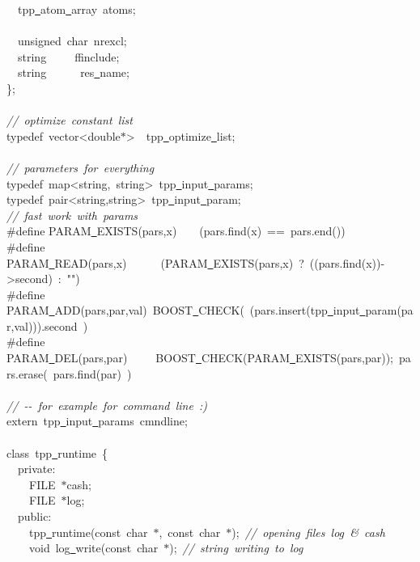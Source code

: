 \documentclass[a4paper,10pt]{article}
\begin{document}
{\ \ tpp\underline\ atom\underline\ array\ atoms;\\
\ \\
\ \ unsigned\ char\ nrexcl;\\
\ \ string\ \ \ \ \ ffinclude;\\
\ \ string\ \ \ \ \ \ res\underline\ name;\\
\};\\
\ \\
\textsl{//\ optimize\ constant\ list}\\
typedef\ vector<{}double$\ast$>{}\ \ tpp\underline\ optimize\underline\ list;\\
\ \\
\textsl{//\ parameters\ for\ everything}\\
typedef\ map<{}string,\ string>{}\ tpp\underline\ input\underline\ params;\\
typedef\ pair<{}string,string>{}\ tpp\underline\ input\underline\ param;\\
\textsl{//\ fast\ work\ with\ params}\\
\#define PARAM\underline\ EXISTS(pars,x)\ \ \ \ (pars.find(x)\ ==\ pars.end())\\
\#define PARAM\underline\ READ(pars,x)\ \ \ \ \ \ (PARAM\underline\ EXISTS(pars,x)\ ?\ ((pars.find(x))-{}>{}second)\ :\ "{}"{})\\
\#define PARAM\underline\ ADD(pars,par,val)\ BOOST\underline\ CHECK(\ (pars.insert(tpp\underline\ input\underline\ param(par,val))).second\ )\\
\#define PARAM\underline\ DEL(pars,par)\ \ \ \ \ BOOST\underline\ CHECK(PARAM\underline\ EXISTS(pars,par));\ pars.erase(\ pars.find(par)\ )\\
\ \\
\textsl{//\ -{}-{}\ for\ example\ for\ command\ line\ :)}\\
extern\ tpp\underline\ input\underline\ params\ cmndline;\\
\ \\
class\ tpp\underline\ runtime\ \{\\
\ \ private:\\
\ \ \ \ FILE\ $\ast$cash;\\
\ \ \ \ FILE\ $\ast$log;\\
\ \ public:\\
\ \ \ \ tpp\underline\ runtime(const\ char\ $\ast$,\ const\ char\ $\ast$);\ \textsl{//\ opening\ files\ log\ \&\ cash}\\
\ \ \ \ void\ log\underline\ write(const\ char\ $\ast$);\ \textsl{//\ string\ writing\ to\ log}\\
}
\end{document}
